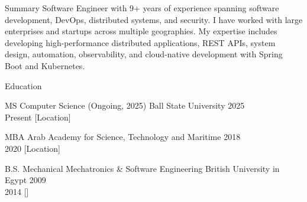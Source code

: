 \documentclass{resume} %
\begin{document}



\begin{rSection}{Summary}
    Software Engineer with 9+ years of experience spanning software development, DevOps, distributed systems, and security. I have worked with large enterprises and startups across multiple geographies. My expertise includes developing high-performance distributed applications, REST APIs, system design, automation, observability, and cloud-native development with Spring Boot and Kubernetes.
\end{rSection}


\begin{rSection}{Education}
    \begin{rESubsection}
        {MS Computer Science (Ongoing, 2025)}
        {Ball State University}
        {2025 \\ Present}
        [Location] %
    \end{rESubsection}

    \begin{rESubsection}
        {MBA}
        {Arab Academy for Science, Technology and Maritime}
        {2018 \\ 2020}
        [Location] %
    \end{rESubsection}

    \begin{rESubsection}
        {B.S. Mechanical Mechatronics & Software Engineering}
        {British University in Egypt}
        {2009 \\ 2014}
        [] %
    \end{rESubsection}
\end{rSection}
\end{document}
